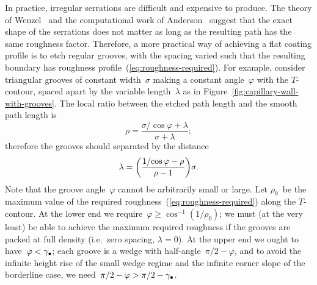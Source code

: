 In practice, irregular serrations are difficult and expensive to produce.
The theory of Wenzel~\cite{wenzel-1936-resistance-solid-surfaces-wetting}
and the computational work of Anderson~\cite[Section~6.4.5]%
  {anderson-2002-thesis-boundary-tracing-pdes}
suggest that the exact shape of the serrations does not matter
as long as the resulting path has the same roughness factor.
Therefore, a more practical way of achieving a flat coating profile
is to etch regular grooves,
with the spacing varied such that
the resulting boundary has roughness profile~(\ref{eq:roughness-required}).
For example, consider triangular grooves of constant width~$\sigma$
making a constant angle~$\varphi$ with the $T$-contour,
spaced apart by the variable length~$\lambda$
as in Figure~\ref{fig:capillary-wall-with-grooves}.
The local ratio
between the etched path length and the smooth path length
is
\begin{equation}
  \rho = \frac{\sigma / {\cos\varphi} + \lambda}{\sigma + \lambda};
  \label{eq:regular-groove-roughness}
\end{equation}
therefore the grooves should separated by the distance
\begin{equation}
  \lambda = \roundbr*{\frac{1 / {\cos\varphi} - \rho}{\rho - 1}} \sigma.
  \label{eq:regular-groove-spacing}
\end{equation}
Note that the groove angle~$\varphi$ cannot be arbitrarily small or large.
Let $\rho_0$~be the maximum value
of the required roughness~(\ref{eq:roughness-required})
along the $T$-contour.
At the lower end we require~$\varphi \ge \cos^{-1} (1 / \rho_0)$;
we must (at the very least) be able to achieve the maximum required roughness
if the grooves are packed at full density (i.e.~zero spacing, $\lambda = 0$).
At the upper end we ought to have~$\varphi < \gamma_\bullet$;
each groove is a wedge with half-angle~$\pi/2 - \varphi$,
and to avoid the infinite height rise of the small wedge regime
and the infinite corner slope of the borderline case,
we need~$\pi/2 - \varphi > \pi/2 - \gamma_\bullet$.


